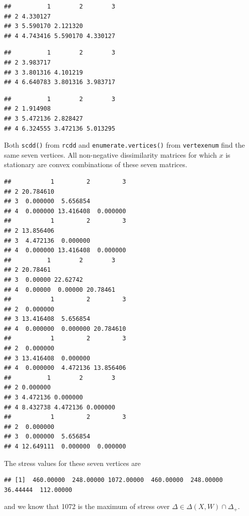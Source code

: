 \documentclass[
  12pt,
]{book}
\theoremstyle{definition}
\theoremstyle{definition}
\theoremstyle{definition}
\theoremstyle{definition}
\theoremstyle{remark}
\begin{document}
\begin{verbatim}
##          1        2        3
## 2 4.330127                  
## 3 5.590170 2.121320         
## 4 4.743416 5.590170 4.330127
\end{verbatim}

\begin{verbatim}
##          1        2        3
## 2 3.983717                  
## 3 3.801316 4.101219         
## 4 6.640783 3.801316 3.983717
\end{verbatim}

\begin{verbatim}
##          1        2        3
## 2 1.914908                  
## 3 5.472136 2.828427         
## 4 6.324555 3.472136 5.013295
\end{verbatim}

Both \texttt{scdd()} from \texttt{rcdd} and \texttt{enumerate.vertices()} from \texttt{vertexenum} find the same seven vertices. All non-negative dissimilarity matrices for which \(x\) is stationary are convex combinations of these seven matrices.

\begin{verbatim}
##           1         2         3
## 2 20.784610                    
## 3  0.000000  5.656854          
## 4  0.000000 13.416408  0.000000
##           1         2         3
## 2 13.856406                    
## 3  4.472136  0.000000          
## 4  0.000000 13.416408  0.000000
##          1        2        3
## 2 20.78461                  
## 3  0.00000 22.62742         
## 4  0.00000  0.00000 20.78461
##           1         2         3
## 2  0.000000                    
## 3 13.416408  5.656854          
## 4  0.000000  0.000000 20.784610
##           1         2         3
## 2  0.000000                    
## 3 13.416408  0.000000          
## 4  0.000000  4.472136 13.856406
##          1        2        3
## 2 0.000000                  
## 3 4.472136 0.000000         
## 4 8.432738 4.472136 0.000000
##           1         2         3
## 2  0.000000                    
## 3  0.000000  5.656854          
## 4 12.649111  0.000000  0.000000
\end{verbatim}

The stress values for these seven vertices are

\begin{verbatim}
## [1]  460.00000  248.00000 1072.00000  460.00000  248.00000   36.44444  112.00000
\end{verbatim}

and we know that 1072 is the maximum of stress over \(\Delta\in\Delta(X,W)\cap\Delta_+\).
\end{document}
